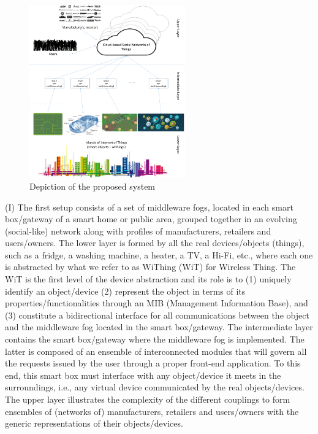 \begin{figure} \vspace{-3mm}
	\centerline{\includegraphics[width=0.60\textwidth]{./fig1.png}}
	\vspace{-3mm} \caption{\small Depiction of the proposed system}
	\label{fig1}
	\vspace{-3mm}
\end{figure}

(I)  The first setup consists of a set of middleware fogs, located in each smart box/gateway of a smart home or public area, grouped together in an evolving (social-like) network along with profiles of manufacturers, retailers and users/owners. The lower layer is formed by all the real devices/objects (things), such as a fridge, a washing machine, a heater, a TV, a Hi-Fi, etc., where each one is abstracted by what we refer to as WiThing (WiT) for Wireless Thing. The WiT is the first level of the device abstraction and its role is to (1) uniquely identify an object/device (2) represent the object in terms of its properties/functionalities through an MIB (Management Information Base), and (3) constitute a bidirectional interface for all communications between the object and the middleware fog located in the smart box/gateway. The intermediate layer contains the smart box/gateway where the middleware fog is implemented. The latter is composed of an ensemble of interconnected modules that will govern all the requests issued by the user through a proper front-end application. To this end, this smart box must interface with any object/device it meets in the surroundings, i.e., any virtual device communicated by the real objects/devices. The upper layer illustrates the complexity of the different couplings to form ensembles of (networks of) manufacturers, retailers and users/owners with the generic representations of their objects/devices. 



